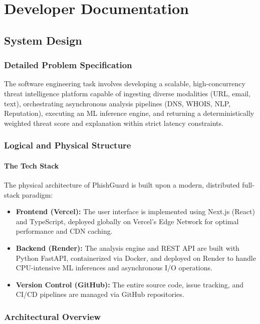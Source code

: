 \chapter{Developer Documentation}
\label{developer-documentation}

\section{System Design}

\subsection{Detailed Problem Specification}
The software engineering task involves developing a scalable, high-concurrency threat intelligence platform capable of ingesting diverse modalities (URL, email, text), orchestrating asynchronous analysis pipelines (DNS, WHOIS, NLP, Reputation), executing an ML inference engine, and returning a deterministically weighted threat score and explanation within strict latency constraints.

\subsection{Logical and Physical Structure}
\subsubsection{The Tech Stack}
The physical architecture of PhishGuard is built upon a modern, distributed full-stack paradigm:
\begin{itemize}
    \item \textbf{Frontend (Vercel):} The user interface is implemented using Next.js (React) and TypeScript, deployed globally on Vercel's Edge Network for optimal performance and CDN caching.
    \item \textbf{Backend (Render):} The analysis engine and REST API are built with Python FastAPI, containerized via Docker, and deployed on Render to handle CPU-intensive ML inferences and asynchronous I/O operations.
    \item \textbf{Version Control (GitHub):} The entire source code, issue tracking, and CI/CD pipelines are managed via GitHub repositories.
\end{itemize}

\subsection{Architectural Overview}\label{architectural-overview}

